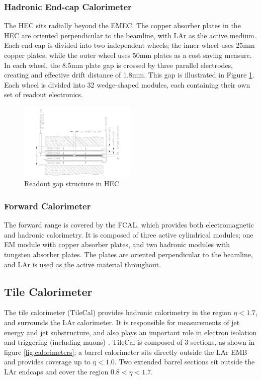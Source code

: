 \subsubsection{Hadronic End-cap Calorimeter}
The HEC sits radially beyond the EMEC. The copper absorber plates in the HEC are oriented perpendicular to the beamline, with LAr as the active medium. Each end-cap is divided into two independent wheels; the inner wheel uses 25mm copper plates, while the outer wheel uses 50mm plates as a cost saving measure. In each wheel, the 8.5mm plate gap is crossed by three parallel electrodes, creating and effective drift distance of 1.8mm. This gap is illustrated in Figure \ref{fig:hec}. Each wheel is divided into 32 wedge-shaped modules, each containing their own set of readout electronics.

\begin{figure}
        \centering
	\includegraphics[width=0.5\textwidth]{figures/ch3/hec.png}
	\caption{Readout gap structure in HEC \cite{lar_tdr}}
	\label{fig:hec}
\end{figure}

\subsubsection{Forward Calorimeter}
The forward range is covered by the FCAL, which provides both electromagnetic and hadronic calorimetry. It is composed of three active cylindrical modules; one EM module with copper absorber plates, and two hadronic modules with tungsten absorber plates. The plates are oriented perpendicular to the beamline, and LAr is used as the active material throughout.

\subsection{Tile Calorimeter}
The tile calorimeter (TileCal) provides hadronic calorimetry in the region $\eta < 1.7$, and surrounds the LAr calorimeter. It is responsible for measurements of jet energy and jet substructure, and also plays an important role in electron isolation and triggering (including muons) \cite{tile_tdr}. TileCal is composed of 3 sections, as shown in figure \ref{fig:calorimeters}; a barrel calorimeter sits directly outside the LAr EMB and provides coverage up to $\eta < 1.0$. Two extended barrel sections sit outside the LAr endcaps and cover the region $0.8 < \eta < 1.7$. \\

